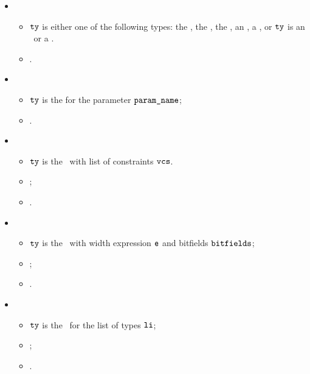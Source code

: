 \ProseParagraph
\OneApplies
\begin{itemize}
  \item {}
  \begin{itemize}
    \item $\tty$ is either one of the following types: the \realtypeterm, the \stringtypeterm,
          the \booleantypeterm, an \enumerationtypeterm, a \namedtypeterm,
          or $\tty$ is an \unconstrainedintegertype\ or a
          \pendingconstrainedintegertype.
    \item \Proseeqdef{$\newty$}{$\tty$}.
  \end{itemize}

  \item {}
  \begin{itemize}
    \item $\tty$ is the \parameterizedintegertype{} for the parameter $\texttt{param\_name}$;
    \item {}.
  \end{itemize}

  \item {}
  \begin{itemize}
    \item $\tty$ is the \wellconstrainedintegertype\ with list of constraints $\texttt{vcs}$.
    \item {};
    \item {}.
  \end{itemize}

  \item {}
  \begin{itemize}
    \item $\tty$ is the \bitvectortypeterm\ with width expression $\ve$ and bitfields $\texttt{bitfields}$;
    \item \Proserenamelocalsexpr{$\ve$}{$\vep$};
    \item {}.
  \end{itemize}

  \item {}
  \begin{itemize}
    \item $\tty$ is the \tupletypeterm\ for the list of types $\texttt{li}$;
    \item {};
    \item {}.
  \end{itemize}


\end{itemize}

